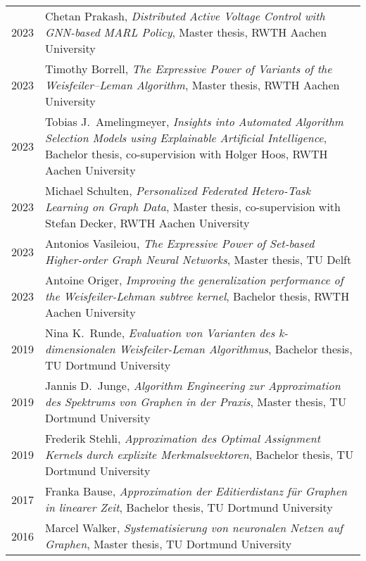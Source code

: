 \documentclass[11pt, a4paper, DIV=14, headings=small]{scrartcl}
\begin{document}
\begin{longtabu}{p{2.1cm}p{12.0cm}}
		2023 & Chetan Prakash, \emph{Distributed Active Voltage Control with GNN-based MARL Policy}, Master thesis, RWTH Aachen University\\  
		2023 & Timothy Borrell, \emph{The Expressive Power of Variants of the Weisfeiler--Leman Algorithm}, Master thesis, RWTH Aachen University\\
		2023 & Tobias J.\ Amelingmeyer, \emph{Insights into Automated Algorithm Selection Models using Explainable Artificial Intelligence}, Bachelor thesis, co-supervision with Holger Hoos, RWTH Aachen University \\
		2023 & Michael Schulten, \emph{Personalized Federated Hetero-Task Learning on Graph Data}, Master thesis, co-supervision with Stefan Decker, RWTH Aachen University                                         \\
		2023 & Antonios Vasileiou, \emph{The Expressive Power of Set-based Higher-order Graph Neural Networks}, Master thesis, TU Delft                                                                             \\
		2023 & Antoine Origer, \emph{Improving the generalization performance of the Weisfeiler-Lehman subtree kernel}, Bachelor thesis, RWTH Aachen University                                                     \\
		2019 & Nina K.\ Runde, \emph{Evaluation von Varianten des k-dimensionalen Weisfeiler-Leman Algorithmus}, Bachelor thesis, TU Dortmund University                                                            \\
		2019 & Jannis D.\ Junge, \emph{Algorithm Engineering zur Approximation des Spektrums von Graphen in der Praxis}, Master thesis, TU Dortmund University                                                      \\
		2019 & Frederik Stehli, \emph{Approximation des Optimal Assignment Kernels durch explizite Merkmalsvektoren}, Bachelor thesis, TU Dortmund University                                                       \\
		2017 & Franka Bause, \emph{Approximation der Editierdistanz für Graphen in linearer Zeit}, Bachelor thesis, TU Dortmund University                                                                          \\
		2016 & Marcel Walker, \emph{Systematisierung von neuronalen Netzen auf Graphen}, Master thesis, TU Dortmund University                                                                                      \\

\end{longtabu}
\end{document}
